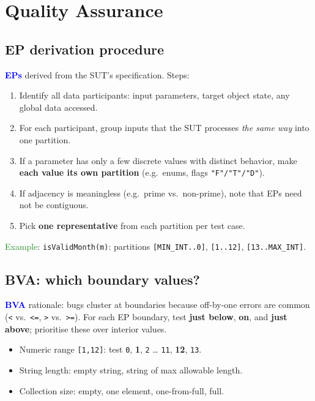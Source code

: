 \section{Quality Assurance}

\subsection{EP derivation procedure}
\textcolor{Blue}{\textbf{EPs}} derived from the SUT's specification. Steps:
\begin{enumerate}
  \item Identify all \textcolor{Bittersweet}{data participants}: input parameters, target object state, any global data accessed.
  \item For each participant, group inputs that the SUT processes \emph{the same way} into one partition.
  \item If a parameter has only a few discrete values with distinct behavior, make \textbf{each value its own partition} (e.g.\ enums, flags \texttt{"F"/"T"/"D"}).
  \item If adjacency is meaningless (e.g.\ prime vs.\ non-prime), note that EPs need not be contiguous.
  \item Pick \textbf{one representative} from each partition per test case.
\end{enumerate}
\textcolor{ForestGreen}{Example}: \texttt{isValidMonth(m)}: partitions \texttt{[MIN\_INT..0]}, \texttt{[1..12]}, \texttt{[13..MAX\_INT]}.

\subsection{BVA: which boundary values?}
\textcolor{Blue}{\textbf{BVA}} rationale: bugs cluster at boundaries because off-by-one errors are common (\texttt{<} vs.\ \texttt{<=}, \texttt{>} vs.\ \texttt{>=}).
For each EP boundary, test \textbf{just below}, \textbf{on}, and \textbf{just above}; prioritise these over interior values.
\begin{itemize}
  \item \textcolor{Bittersweet}{Numeric range \texttt{[1,12]}}: test \texttt{0}, \textbf{1}, \texttt{2} … \texttt{11}, \textbf{12}, \texttt{13}.
  \item \textcolor{Bittersweet}{String length}: empty string, string of max allowable length.
  \item \textcolor{Bittersweet}{Collection size}: empty, one element, one-from-full, full.
\end{itemize}

